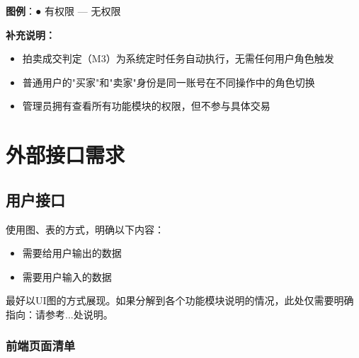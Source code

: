 \documentclass[12pt,a4paper]{ctexart}
\numberwithin{figure}{section}
\numberwithin{table}{section}
\begin{document}
\textbf{图例}：● 有权限 \quad --- 无权限

\textbf{补充说明：}

\begin{itemize}
    \item 拍卖成交判定（M3）为系统定时任务自动执行，无需任何用户角色触发
    \item 普通用户的"买家"和"卖家"身份是同一账号在不同操作中的角色切换
    \item 管理员拥有查看所有功能模块的权限，但不参与具体交易
\end{itemize}

\section{外部接口需求}

\subsection{用户接口}

使用图、表的方式，明确以下内容：

\begin{itemize}
    \item 需要给用户输出的数据
    \item 需要用户输入的数据
\end{itemize}

最好以UI图的方式展现。如果分解到各个功能模块说明的情况，此处仅需要明确指向：请参考...处说明。

\subsubsection{前端页面清单}
\end{document}
